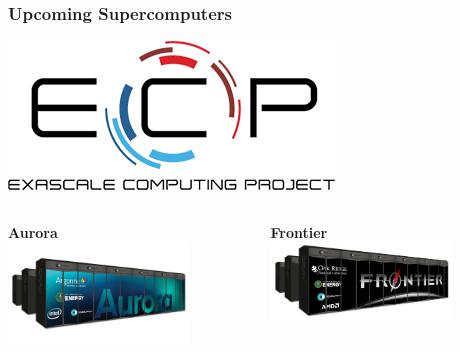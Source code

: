 \begin{frame}
  \frametitle{Upcoming Supercomputers}
    \begin{center}
      \includegraphics[width=.25\textwidth]{./figures/ecp} \\
    \end{center}
  \begin{columns}[T]
    \begin{column}{0.49\textwidth}
      \begin{center}
        {\bf Aurora}\\
        \includegraphics[width=0.75\textwidth]{./figures/aurora}
      \end{center}
    \end{column}
    \begin{column}{0.49\textwidth}
      \begin{center}
        {\bf Frontier}\\
        \includegraphics[width=0.75\textwidth]{./figures/frontier}
      \end{center}
    \end{column}
  \end{columns}
  \begin{columns}[T]
    \begin{column}{0.49\textwidth}
    \begin{itemize}

\end{itemize}
\end{column}
\end{columns}
\end{frame}
